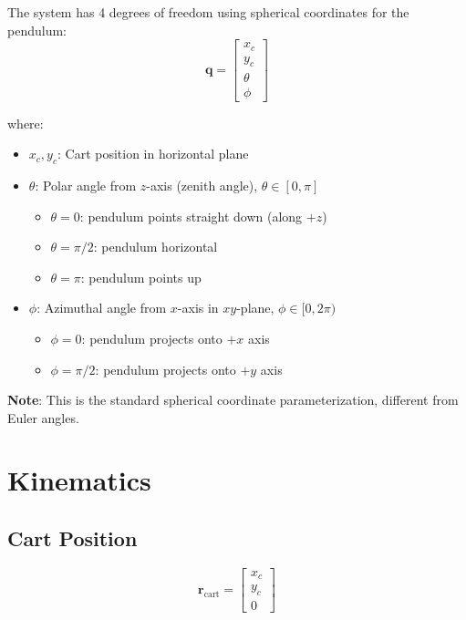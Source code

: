 \documentclass[12pt]{article}
\begin{document}
The system has 4 degrees of freedom using spherical coordinates for the pendulum:
\begin{equation}
    \mathbf{q} = \begin{bmatrix} x_c \\ y_c \\ \theta \\ \phi \end{bmatrix}
\end{equation}

where:
\begin{itemize}
    \item $x_c, y_c$: Cart position in horizontal plane
    \item $\theta$: Polar angle from $z$-axis (zenith angle), $\theta \in [0, \pi]$
    \begin{itemize}
        \item $\theta = 0$: pendulum points straight down (along $+z$)
        \item $\theta = \pi/2$: pendulum horizontal
        \item $\theta = \pi$: pendulum points up
    \end{itemize}
    \item $\phi$: Azimuthal angle from $x$-axis in $xy$-plane, $\phi \in [0, 2\pi)$
    \begin{itemize}
        \item $\phi = 0$: pendulum projects onto $+x$ axis
        \item $\phi = \pi/2$: pendulum projects onto $+y$ axis
    \end{itemize}
\end{itemize}

\textbf{Note}: This is the standard spherical coordinate parameterization, different from Euler angles.

\section{Kinematics}

\subsection{Cart Position}
\begin{equation}
    \mathbf{r}_{\text{cart}} = \begin{bmatrix} x_c \\ y_c \\ 0 \end{bmatrix}
\end{equation}
\end{document}
